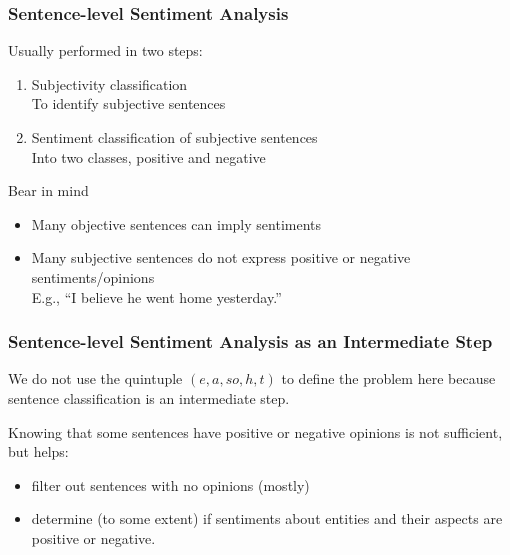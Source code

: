 \documentclass[t]{beamer}
\begin{document}
\begin{frame} \frametitle{Sentence-level Sentiment Analysis} %


\begin{block}{Usually performed in two steps:}
\begin{enumerate}
\item Subjectivity classification \\
To identify subjective sentences 
\item Sentiment classification of subjective sentences \\
Into two classes, positive and negative
\end{enumerate}
\end{block}

\begin{block}{Bear in mind}
\begin{itemize}
\item Many objective sentences can imply sentiments 
\item Many subjective sentences do not express positive or negative sentiments/opinions \\
E.g., ``I believe he went home yesterday.''
\end{itemize}
\end{block}

\end{frame}



\begin{frame} \frametitle{Sentence-level Sentiment Analysis as an Intermediate Step} %


We do not use the quintuple $(e, a, so, h, t)$ to define the problem
here because sentence classification is an intermediate step.

\vfill

Knowing that some sentences have positive or negative opinions is not
sufficient, but helps: 
\begin{itemize}
\item filter out sentences with no opinions (mostly) 
\item determine (to some extent) if sentiments about entities and
  their aspects are positive or negative. 
\end{itemize}
\end{frame}
\end{document}
